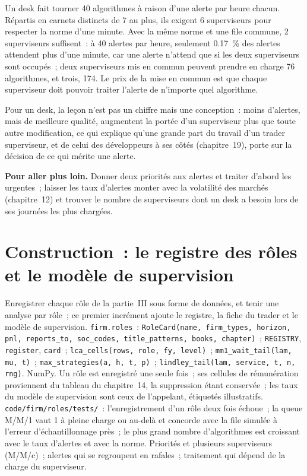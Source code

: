 \begin{example}\label{ex:in:trader:pool}
Un desk fait tourner 40 algorithmes à raison d'une alerte par heure chacun. Répartis en carnets distincts de 7 au plus, ils exigent 6 superviseurs pour
respecter la norme d'une minute. Avec la même norme et une file commune, 2 superviseurs suffisent~: à 40 alertes par heure,
seulement 0.17~\% des alertes attendent plus d'une minute, car une alerte n'attend que si les deux superviseurs sont occupés~; deux superviseurs mis en commun
peuvent prendre en charge 76 algorithmes, et trois, 174. Le prix de la mise en commun est que chaque superviseur doit pouvoir traiter
l'alerte de n'importe quel algorithme.
\end{example}

Pour un desk, la leçon n'est pas un chiffre mais une conception~: moins d'alertes, mais de meilleure qualité, augmentent la portée d'un superviseur plus que toute autre
modification, ce qui explique qu'une grande part du travail d'un trader superviseur, et de celui des développeurs à ses côtés (chapitre~19), porte
sur la décision de ce qui mérite une alerte.

\textbf{Pour aller plus loin.} Donner deux priorités aux alertes et traiter d'abord les urgentes~; laisser les taux d'alertes monter avec la volatilité des marchés
(chapitre~12) et trouver le nombre de superviseurs dont un desk a besoin lors de ses journées les plus chargées.

\section{Construction~: le registre des rôles et le modèle de supervision}\label{bld:in:trader:roles}

\begin{build}
 Enregistrer chaque rôle de la partie~III sous forme de données, et tenir une analyse par rôle~; ce premier incrément ajoute le
registre, la fiche du trader et le modèle de supervision.
 \texttt{firm.roles}~:
\texttt{RoleCard(name, firm\_types, horizon, pnl, reports\_to, soc\_codes, title\_patterns, books, chapter)}~; \texttt{REGISTRY}, \texttt{register}, \texttt{card}~;
\texttt{lca\_cells(rows, role, fy, level)}~; \texttt{mm1\_wait\_tail(lam, mu, t)}~; \texttt{max\_strategies(a, h, t, p)}~;
\texttt{lindley\_tail(lam, service, t, n, rng)}. NumPy.
 Un rôle est enregistré une seule fois~; ses cellules de rémunération proviennent du tableau du chapitre~14, la suppression étant conservée~; les
taux du modèle de supervision sont ceux de l'appelant, étiquetés illustratifs.
 \texttt{code/firm/roles/tests/}~: l'enregistrement d'un rôle deux fois échoue~; la queue M/M/1 vaut 1 à
pleine charge ou au-delà et concorde avec la file simulée à l'erreur d'échantillonnage près~; le plus grand nombre d'algorithmes est croissant
avec le taux d'alertes et avec la norme.
 Priorités et plusieurs superviseurs (M/M/c)~; alertes qui se regroupent en rafales~; traitement qui dépend de la
charge du superviseur.
\end{build}

